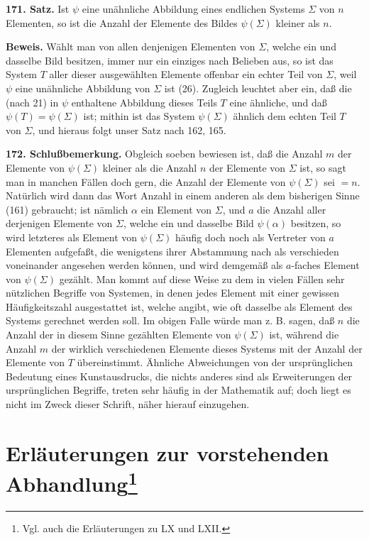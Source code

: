 \documentclass[11pt]{article}
\begin{document}
\noindent\textbf{171. Satz.} Ist $\psi$ eine unähnliche Abbildung eines endlichen Systems $\Sigma$ von $n$ Elementen, so ist die Anzahl der Elemente des Bildes $\psi(\Sigma)$ kleiner als $n$.

\noindent\textbf{Beweis.} Wählt man von allen denjenigen Elementen von $\Sigma$, welche ein und dasselbe Bild besitzen, immer nur ein einziges nach Belieben aus, so ist das System $T$ aller dieser ausgewählten Elemente offenbar ein echter Teil von $\Sigma$, weil $\psi$ eine unähnliche Abbildung von $\Sigma$ ist (26). Zugleich leuchtet aber ein, daß die (nach 21) in $\psi$ enthaltene Abbildung dieses Teils $T$ eine ähnliche, und daß $\psi(T)=\psi(\Sigma)$ ist; mithin ist das System $\psi(\Sigma)$ ähnlich dem echten Teil $T$ von $\Sigma$, und hieraus folgt unser Satz nach 162, 165.

\noindent\textbf{172. Schlußbemerkung.} Obgleich soeben bewiesen ist, daß die Anzahl $m$ der Elemente von $\psi(\Sigma)$ kleiner als die Anzahl $n$ der Elemente von $\Sigma$ ist, so sagt man in manchen Fällen doch gern, die Anzahl der Elemente von $\psi(\Sigma)$ sei $=n$. Natürlich wird dann das Wort Anzahl in einem anderen als dem bisherigen Sinne (161) gebraucht; ist nämlich $\alpha$ ein Element von $\Sigma$, und $a$ die Anzahl aller derjenigen Elemente von $\Sigma$, welche ein und dasselbe Bild $\psi(\alpha)$ besitzen, so wird letzteres als Element von $\psi(\Sigma)$ häufig doch noch als Vertreter von $a$ Elementen aufgefaßt, die wenigstens ihrer Abstammung nach als verschieden voneinander angesehen werden können, und wird demgemäß als $a$-faches Element von $\psi(\Sigma)$ gezählt. Man kommt auf diese Weise zu dem in vielen Fällen sehr nützlichen Begriffe von Systemen, in denen jedes Element mit einer gewissen Häufigkeitszahl ausgestattet ist, welche angibt, wie oft dasselbe als Element des Systems gerechnet werden soll. Im obigen Falle würde man z. B. sagen, daß $n$ die Anzahl der in diesem Sinne gezählten Elemente von $\psi(\Sigma)$ ist, während die Anzahl $m$ der wirklich verschiedenen Elemente dieses Systems mit der Anzahl der Elemente von $T$ übereinstimmt. Ähnliche Abweichungen von der ursprünglichen Bedeutung eines Kunstausdrucks, die nichts anderes sind als Erweiterungen der ursprünglichen Begriffe, treten sehr häufig in der Mathematik auf; doch liegt es nicht im Zweck dieser Schrift, näher hierauf einzugehen.

\renewcommand{\thefootnote}{*}
\section*{Erläuterungen zur vorstehenden Abhandlung\footnote{Vgl. auch die Erläuterungen zu LX und LXII.}}
\renewcommand{\thefootnote}{\arabic{footnote}}
\end{document}
